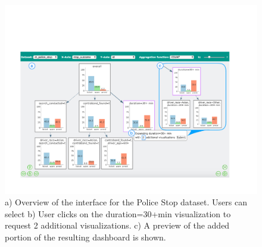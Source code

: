 \begin{figure}[ht!]
\centering
\includegraphics[width=0.9\linewidth,frame]{figures/overview_interface_expand.pdf}
\caption{a) Overview of the \system interface for the Police Stop dataset. Users can  select  b) User clicks on the duration=30+min visualization to request 2 additional visualizations. c) A preview of the added portion of the resulting dashboard is shown.}
\label{fig:overview}
\vspace{-10pt}
\end{figure}%
